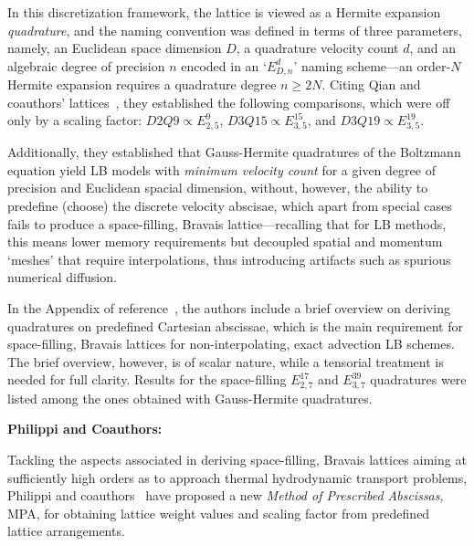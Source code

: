     In this discretization framework, the lattice is viewed as a Hermite expansion \emph{quadrature}, and the naming  convention
    was defined in terms of three parameters, namely, an Euclidean space dimension $D$, a quadrature velocity count $d$, and  an
    algebraic degree of precision $n$ encoded in an `$E_{D,n}^{d}$' naming scheme---an order-$N$ Hermite  expansion  requires  a
    quadrature degree $n \geqslant 2N$. Citing Qian  and  coauthors'  lattices~\cite{1992-QianYH+LallemandP-EuroPhysLett},  they
    established the following comparisons, which were off only by a scaling factor: $D2Q9 \propto E_{2,5}^{9}$,  $D3Q15  \propto
    E_{3,5}^{15}$, and $D3Q19 \propto E_{3,5}^{19}$.

    Additionally, they established that Gauss-Hermite quadratures of the Boltzmann equation yield LB models  with  \emph{minimum
    velocity count} for a given degree of precision and Euclidean spacial dimension, without, however, the ability to  predefine
    (choose) the discrete velocity abscisae,  which  apart  from  special  cases  fails  to  produce  a  space-filling,  Bravais
    lattice---recalling that for LB methods, this means lower memory requirements but decoupled spatial  and  momentum  `meshes'
    that require interpolations, thus introducing artifacts such as spurious numerical diffusion.

    In the  Appendix  of  reference~\cite{2006-ShanX+ChenH-JFluidMech},  the  authors  include  a  brief  overview  on  deriving
    quadratures on predefined Cartesian abscissae, which is  the  main  requirement  for  space-filling,  Bravais  lattices  for
    non-interpolating, exact advection LB schemes. The brief overview, however, is of scalar nature, while a tensorial treatment
    is needed for full clarity. Results for the space-filling $E_{2,7}^{17}$ and $E_{3,7}^{39}$ quadratures  were  listed  among
    the ones obtained with Gauss-Hermite quadratures.



    \vspace{2.0mm}\noindent\textbf{Philippi and Coauthors:}\vspace{1.0mm}

    Tackling the aspects associated in deriving space-filling, Bravais  lattices  aiming  at  sufficiently  high  orders  as  to
    approach thermal  hydrodynamic  transport  problems,  Philippi  and  coauthors~\cite{2006-PhilippiPC+SurmasR-PhysRevE}  have
    proposed a new \emph{Method of Prescribed Abscissas\/}, MPA, for obtaining lattice weight values  and  scaling  factor  from
    predefined lattice arrangements.


